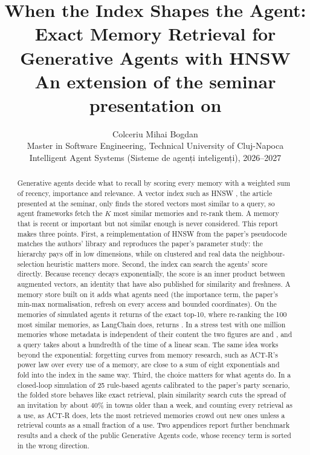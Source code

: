 \documentclass[11pt,a4paper]{article}
\title{\textbf{When the Index Shapes the Agent:\\ Exact Memory Retrieval for Generative Agents with HNSW}\\[0.4em]
\large An extension of the seminar presentation on \citet{malkov2020hnsw}}
\author{Colceriu Mihai Bogdan\\[0.2em]
\small Master in Software Engineering, Technical University of Cluj-Napoca\\
\small Intelligent Agent Systems (Sisteme de agenți inteligenți), 2026--2027}
\date{}
\begin{document}
\maketitle

\begin{abstract}
\noindent Generative agents \citep{park2023generative} decide what to recall by scoring every memory with a weighted sum of recency, importance and relevance. A vector index such as HNSW \citep{malkov2020hnsw}, the article presented at the seminar, only finds the stored vectors most similar to a query, so agent frameworks fetch the $K$ most similar memories and re-rank them. A memory that is recent or important but not similar enough is never considered. This report makes three points. First, a reimplementation of HNSW from the paper's pseudocode matches the authors' library and reproduces the paper's parameter study: the hierarchy pays off in low dimensions, while on clustered and real data the neighbour-selection heuristic matters more. Second, the index can search the agents' score directly. Because recency decays exponentially, the score is an inner product between augmented vectors, an identity that \citet{wei2026tango} have also published for similarity and freshness. A memory store built on it adds what agents need (the importance term, the paper's min-max normalisation, refresh on every access and bounded coordinates). On the memories of simulated agents it returns \TwOursRecall{} of the exact top-10, where re-ranking the 100 most similar memories, as LangChain does, returns \TwRerankRecall{}. In a stress test with one million memories whose metadata is independent of their content the two figures are \GlOursRecallOneM{} and \GlRerankRecallOneM{}, and a query takes about a hundredth of the time of a linear scan. The same idea works beyond the exponential: forgetting curves from memory research, such as ACT-R's power law over every use of a memory, are close to a sum of eight exponentials and fold into the index in the same way. Third, the choice matters for what agents do. In a closed-loop simulation of 25 rule-based agents calibrated to the paper's party scenario, the folded store behaves like exact retrieval, plain similarity search cuts the spread of an invitation by about 40\% in towns older than a week, and counting every retrieval as a use, as ACT-R does, lets the most retrieved memories crowd out new ones unless a retrieval counts as a small fraction of a use. Two appendices report further benchmark results and a check of the public Generative Agents code, whose recency term is sorted in the wrong direction.
\end{abstract}
\end{document}
